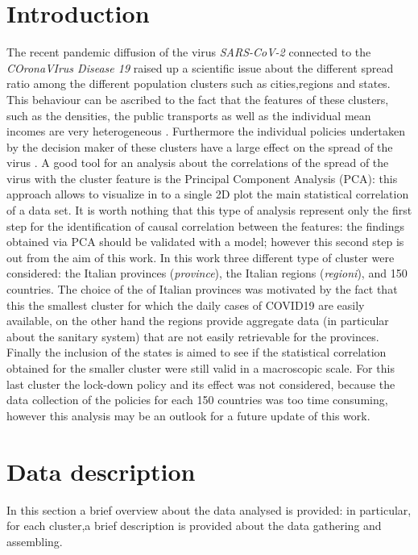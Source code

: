 \documentclass[
12pt, %
a4paper, %
oneside, %
headinclude,footinclude, %
BCOR5mm, %
]{scrartcl}
\begin{document}
\newpage %


\section{Introduction} \label{introduction}
The recent pandemic diffusion of the virus \textit{SARS-CoV-2} connected to the \textit{COronaVIrus Disease 19} raised up a scientific issue about the different spread ratio among the different population clusters such as cities,regions and states. This behaviour can be ascribed to the fact that the features of these clusters, such as the densities, the public transports as well as the individual mean incomes are very heterogeneous \cite{sebhatu2020explaining,skorka2020macroecology}. Furthermore the individual policies undertaken by the decision maker of these clusters have a large effect on the spread of the virus \cite{block2020social}. A good tool for an analysis about the correlations of the spread of the virus with the cluster feature is the Principal Component Analysis (PCA): this approach allows to visualize in to a single 2D plot the main statistical correlation of a data set. It is worth nothing that this type of analysis represent only the first step for the identification of causal correlation between the features: the findings obtained via PCA should be validated with a model; however this second step is out from the aim of this work. In this work three different type of cluster were considered: the Italian provinces (\textit{province}), the Italian regions (\textit{regioni}), and 150 countries. The choice of the of Italian provinces was motivated by the fact that this the smallest cluster for which the daily cases of COVID19 are easily available, on the other hand the regions provide aggregate data (in particular about the sanitary system) that are not easily retrievable for the provinces. Finally the inclusion of the states is aimed to see if the statistical correlation obtained for the smaller cluster were still valid in a macroscopic scale. For this last cluster the lock-down policy and its effect was not considered, because the data collection of the policies for each 150 countries was too time consuming, however this analysis may be an outlook for a future update of this work. 

\section{Data description} \label{Data_description}
In this section a brief overview about the data analysed is provided: in particular, for each cluster,a brief description is provided  about the data gathering and assembling. 
\end{document}
